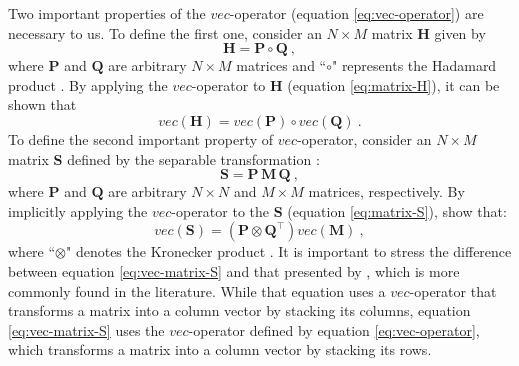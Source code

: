Two important properties of the $vec$-operator (equation \ref{eq:vec-operator}) 
are necessary to us. 
To define the first one, consider an 
$N \times M$ matrix $\mathbf{H}$ given by
\begin{equation}
\mathbf{H} = \mathbf{P} \circ \mathbf{Q} \: ,
\label{eq:matrix-H}
\end{equation}
where $\mathbf{P}$ and $\mathbf{Q}$ are arbitrary $N \times M$ matrices and 
``$\circ$" represents the Hadamard product \citep[][ p. 298]{horn_johnson1991}.
By applying the $vec$-operator to $\mathbf{H}$ (equation \ref{eq:matrix-H}), 
it can be shown that
\begin{equation}
vec \left( \mathbf{H} \right) = 
vec \left( \mathbf{P} \right) \circ vec \left( \mathbf{Q} \right) \: .
\label{eq:vec-matrix-H}
\end{equation}
To define the second important property of $vec$-operator, 
consider an $N \times M$ matrix $\mathbf{S}$ defined by 
the separable transformation \citet[][ p. 31]{jain1989}:
\begin{equation}
\mathbf{S} = \mathbf{P \, M \, Q} \: ,
\label{eq:matrix-S}
\end{equation}
where $\mathbf{P}$ and $\mathbf{Q}$ are arbitrary $N \times N$ and $M \times M$ 
matrices, respectively.
By implicitly applying the $vec$-operator to 
the $\mathbf{S}$ (equation \ref{eq:matrix-S}), 
\citet[][ p. 31]{jain1989} show that:
\begin{equation}
vec \left( \mathbf{S} \right) = 
\left( \mathbf{P} \otimes \mathbf{Q}^{\top} \right) 
vec \left( \mathbf{M} \right) \: ,
\label{eq:vec-matrix-S}
\end{equation}
where ``$\otimes$" denotes the Kronecker product \citep{neudecker1969}.
It is important to stress the difference between equation \ref{eq:vec-matrix-S}
and that presented by \citet{neudecker1969}, which is more commonly found in 
the literature.
While that equation uses a $vec$-operator that transforms a matrix into a column 
vector by stacking its columns, equation \ref{eq:vec-matrix-S} 
uses the $vec$-operator defined by equation \ref{eq:vec-operator}, which 
transforms a matrix into a column vector by stacking its rows.

